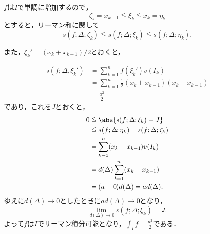 \begin{tanswer}
    $f$は$I$で単調に増加するので，
    \[
        \zeta_k = x_{k-1} \leqq \xi_k \leqq x_k=\eta_k
    \]
    とすると，リーマン和に関して
    \[
        s(f;\Delta ; \zeta_k ) \leqq s(f;\Delta;\xi_k) \leqq s(f;\Delta;\eta_k).
    \]

    また，$\xi_k' = (x_k+x_{k-1} )/2 $とおくと，

    \begin{align*}
        s(f;\Delta,\xi_k' ) & = \sum_{k=1}^{n} f(\xi_k ') v(I_k)                          \\
                            & =  \sum_{k=1}^{n} \frac{1}{2} (x_k +x_{k-1})(x_k - x_{k-1}) \\
                            & = \frac{a^2}{2}
    \end{align*}
    であり，これを$J$とおくと，
    \begin{align*}
        0 & \leqq \abs{s(f;\Delta; \xi_k)-J }                 \\
          & \leqq  s(f;\Delta;\eta_k) -s(f;\Delta ; \zeta_k ) \\
          & = \sum_{k=1}^{n} (x_k-x_{k-1} ) v(I_k)            \\
          & = d(\Delta) \sum_{k=1}^{n} (x_k-x_{k-1} )         \\
          & = (a-0) d(\Delta)=a d(\Delta).
    \end{align*}
    ゆえに$d (\Delta) \to 0$としたときに$a d(\Delta) \to 0$となり，
    \[
        \lim_{d(\Delta) \to 0} s(f;\Delta; \xi_k)=J.
    \]
    よって$f$は$I$でリーマン積分可能となり，$\int_{I} f = \frac{a^2}{2}$である．
\end{tanswer}


